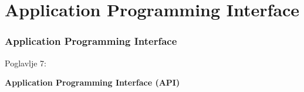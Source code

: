 %

\section{Application Programming Interface}
\begin{frame}[fragile]
	\frametitle{Application Programming Interface}

	\begin{center}\huge{Poglavlje 7:}\end{center}
	\begin{center}\huge{\color{typo3darkgrey}\textbf{Application Programming Interface (API)}}\end{center}

\end{frame}


